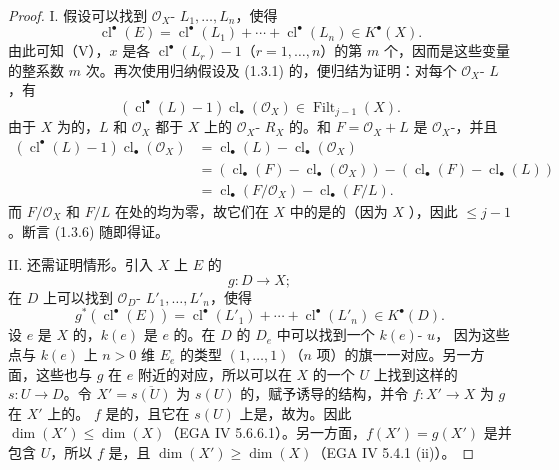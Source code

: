 \begin{proof}
I. 假设可以找到 $\mathcal O_X$- $L_1,\ldots,L_n$，使得
\[\operatorname{cl}^\bullet(E)=\operatorname{cl}^\bullet(L_1)+\cdots+\operatorname{cl}^\bullet(L_n)\in K^\bullet(X).\]
由此可知（V），$x$ 是各 $\operatorname{cl}^\bullet(L_r)-1$（$r=1,\ldots,n$）的第 $m$ 个，因而是这些变量的整系数 $m$ 次。再次使用归纳假设及 (1.3.1) 的，便归结为证明：对每个 $\mathcal O_X$- $L$，有
\[(\operatorname{cl}^\bullet(L)-1)\operatorname{cl}_\bullet(\mathcal O_X)\in\operatorname{Filt}_{j-1}(X).\tag{1.3.6}\]
由于 $X$ 为的，$L$ 和 $\mathcal O_X$ 都于 $X$ 上的 $\mathcal O_X$- $R_X$ 的。和 $F=\mathcal O_X+L$ 是 $\mathcal O_X$-，并且
\[\begin{aligned}
(\operatorname{cl}^\bullet(L)-1)\operatorname{cl}_\bullet(\mathcal O_X)
&=\operatorname{cl}_\bullet(L)-\operatorname{cl}_\bullet(\mathcal O_X)\\
&=(\operatorname{cl}_\bullet(F)-\operatorname{cl}_\bullet(\mathcal O_X))-(\operatorname{cl}_\bullet(F)-\operatorname{cl}_\bullet(L))\\
&=\operatorname{cl}_\bullet(F/\mathcal O_X)-\operatorname{cl}_\bullet(F/L).
\end{aligned}\]
而 $F/\mathcal O_X$ 和 $F/L$ 在处的均为零，故它们在 $X$ 中的是的（因为 $X$ ），因此 $\leq j-1$。断言 (1.3.6) 随即得证。

II. 还需证明情形。引入 $X$ 上 $E$ 的
\[g:D\longrightarrow X;\]
在 $D$ 上可以找到 $\mathcal O_D$- $L'_1,\ldots,L'_n$，使得
\[g^*(\operatorname{cl}^\bullet(E))=\operatorname{cl}^\bullet(L'_1)+\cdots+\operatorname{cl}^\bullet(L'_n)\in K^\bullet(D).\tag{1.3.7}\]
设 $e$ 是 $X$ 的，$k(e)$ 是 $e$ 的。在 $D$ 的 $D_e$ 中可以找到一个 $k(e)$- $u$，
因为这些点与 $k(e)$ 上 $n>0$ 维 $E_e$ 的类型 $(1,\ldots,1)$（$n$ 项）的旗一一对应。另一方面，这些也与 $g$ 在 $e$ 附近的对应，所以可以在 $X$ 的一个 $U$ 上找到这样的 $s:U\longrightarrow D$。令 $X'=\overline{s(U)}$ 为 $s(U)$ 的，赋予诱导的结构，并令 $f:X'\longrightarrow X$ 为 $g$ 在 $X'$ 上的。 $f$ 是的，且它在 $s(U)$ 上是，故为。因此 $\dim(X')\leq\dim(X)$（EGA IV 5.6.6.1）。另一方面，$f(X')=g(X')$ 是并包含 $U$，所以 $f$ 是，且 $\dim(X')\geq\dim(X)$（EGA IV 5.4.1 (ii)）。


\end{proof}
